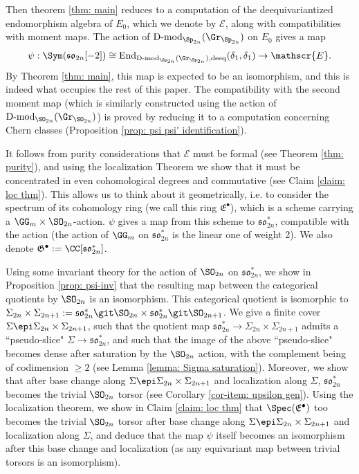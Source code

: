 \documentclass[11pt]{article}
\begin{document}
Then theorem \ref{thm: main} reduces to a computation of the deequivariantized endomorphism algebra of $E_0$, which we denote by $\mathscr{E}$, along with compatibilities with moment maps. The action of $\operatorname{D-mod}_{\Sp_{2n}}(\Gr_{\Sp_{2n}})$ on $E_0$ gives a map
$$\psi: \Sym(\mathfrak{so}_{2n}[-2])\cong \mathrm{End}_{\operatorname{D-mod}_{\Sp_{2n}}(\Gr_{\Sp_{2n}}),\mathrm{deeq}}(\delta_1, \delta_1)\to \mathscr{E}.$$
By Theorem \ref{thm: main}, this map is expected to be an isomorphism, and this is indeed what occupies the rest of this paper.
The compatibility with the second moment map (which is similarly constructed using the action of $\operatorname{D-mod}_{\SO_{2n}}(\Gr_{\SO_{2n}})$) is proved by reducing it to a computation concerning Chern classes (Proposition \ref{prop: psi psi' identification}).

It follows from purity considerations that $\mathscr{E}$ must be formal (see Theorem \ref{thm: purity}), and using the localization Theorem we show that it must be concentrated in even cohomological degrees and commutative (see Claim \ref{claim: loc thm}). This allows us to think about it geometrically, i.e. to consider the spectrum of its cohomology ring (we call this ring $\mathfrak{E}^\bullet$), which is a scheme carrying a $\GG_m\times \SO_{2n}$-action. $\psi$ gives a map from this scheme to $\mathfrak{so}_{2n}^*$, compatible with the action (the action of $\GG_m$ on $\mathfrak{so}_{2n}^*$ is the linear one of weight 2). We also denote $\mathfrak{G}^\bullet:=\CC[\mathfrak{so}_{2n}^*]$.

Using some invariant theory for the action of $\SO_{2n}$ on $\mathfrak{so}_{2n}^*$, we show in Proposition \ref{prop: psi-inv} that the resulting map between the categorical quotients by $\SO_{2n}$ is an isomorphism. This categorical quotient is isomorphic to $\Sigma_{2n}\times \Sigma_{2n+1}:= \mathfrak{so}_{2n}^* \git \SO_{2n} \times \mathfrak{so}_{2n}^* \git \SO_{2n+1}$.
We give a finite cover $\Sigma\epi\Sigma_{2n}\times \Sigma_{2n+1}$, such that the quotient map $\mathfrak{so}_{2n}^*\to \Sigma_{2n}\times \Sigma_{2n+1}$ admits a ``pseudo-slice" $\Sigma\to \mathfrak{so}_{2n}^*$, and such that the image of the above ``pseudo-slice" becomes dense after saturation by the $\SO_{2n}$ action, with the complement being of codimension $\geq 2$ (see Lemma \ref{lemma: Sigma saturation}).
Moreover, we show that after base change along $\Sigma\epi\Sigma_{2n}\times \Sigma_{2n+1}$ and localization along $\Sigma$, $\mathfrak{so}_{2n}^*$ becomes the trivial $\SO_{2n}$ torsor (see Corollary \ref{cor-item: upsilon gen}).
Using the localization theorem, we show in Claim \ref{claim: loc thm} that $\Spec(\mathfrak{E}^\bullet)$ too becomes the trivial $\SO_{2n}$ torsor after base change along $\Sigma\epi\Sigma_{2n}\times \Sigma_{2n+1}$ and localization along $\Sigma$, and deduce that the map $\psi$ itself becomes an isomorphism after this base change and localization (as any equivariant map between trivial torsors is an isomorphism).
\end{document}
